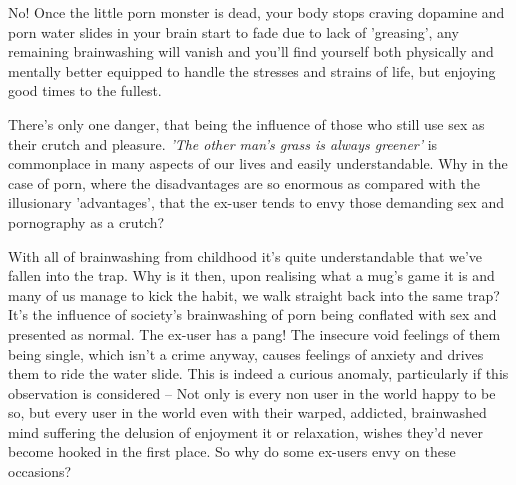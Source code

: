 \documentclass[easypeasy.tex]{subfiles}
\begin{document}
No! Once the little porn monster is dead, your body stops craving dopamine and porn water slides in your brain start to fade due to lack of 'greasing', any remaining brainwashing will vanish and you'll find yourself both physically and mentally better equipped to handle the stresses and strains of life, but enjoying good times to the fullest.

There's only one danger, that being the influence of those who still use sex as their crutch and pleasure. \textit{'The other man's grass is always greener'} is commonplace in many aspects of our lives and easily understandable. Why in the case of porn, where the disadvantages are so enormous as compared with the illusionary 'advantages', that the ex-user tends to envy those demanding sex and pornography as a crutch?

With all of brainwashing from childhood it's quite understandable that we've fallen into the trap. Why is it then, upon realising what a mug's game it is and many of us manage to kick the habit, we walk straight back into the same trap? It's the influence of society's brainwashing of porn being conflated with sex and presented as normal. The ex-user has a pang! The insecure void feelings of them being single, which isn't a crime anyway, causes feelings of anxiety and drives them to ride the water slide. This is indeed a curious anomaly, particularly if this observation is considered -- Not only is every non user in the world happy to be so, but every user in the world even with their warped, addicted, brainwashed mind suffering the delusion of enjoyment it or relaxation, wishes they'd never become hooked in the first place. So why do some ex-users envy on these occasions?
\end{document}
